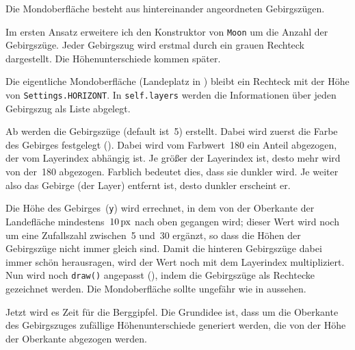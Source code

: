 	Die Mondoberfläche besteht aus hintereinander angeordneten Gebirgszügen.
\er

Im ersten Ansatz erweitere ich den Konstruktor von \texttt{Moon} um die Anzahl der Gebirgszüge. Jeder Gebirgszug wird erstmal durch ein grauen Rechteck dargestellt. Die Höhenunterschiede kommen später. 

Die eigentliche Mondoberfläche (Landeplatz in ) bleibt ein Rechteck mit der Höhe von \texttt{Settings.HORIZONT}. In \texttt{self.layers} werden die Informationen über jeden Gebirgszug als Liste abgelegt. 

Ab  werden die Gebirgszüge (default ist~5) erstellt. Dabei wird zuerst die Farbe des Gebirges festgelegt (). Dabei wird vom Farbwert~180 ein Anteil abgezogen, der vom Layerindex abhängig ist. Je größer der Layerindex ist, desto mehr wird von der~180 abgezogen. Farblich bedeutet dies, dass sie dunkler wird. Je weiter also das Gebirge (der Layer) entfernt ist, desto dunkler erscheint er.

\begin{figure}%
	\begin{center}%
		\vspace{-1cm}%
	\end{center}%
\end{figure}%
Die Höhe des Gebirges~(\texttt{y}) wird errechnet, in dem von der Oberkante der Landefläche mindestens~$\unit[10]{px}$ nach oben gegangen wird; dieser Wert wird noch um eine Zufallszahl zwischen~5 und~30 ergänzt, so dass die Höhen der Gebirgszüge nicht immer gleich sind. Damit die hinteren Gebirgszüge dabei immer schön herausragen, wird der Wert noch mit dem Layerindex multipliziert. Nun wird noch \texttt{draw()} angepasst (), indem die Gebirgszüge als Rechtecke gezeichnet werden. Die Mondoberfläche sollte ungefähr wie in  aussehen. 




Jetzt wird es Zeit für die Berggipfel. Die Grundidee ist, dass um die Oberkante des Gebirgszuges  zufällige Höhenunterschiede generiert werden, die von der Höhe der Oberkante abgezogen werden. 


